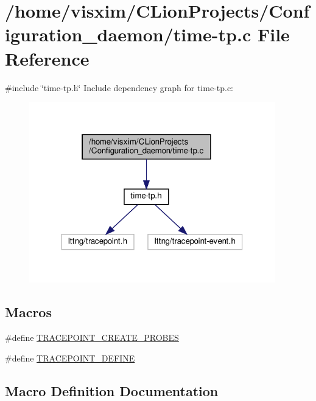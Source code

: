 \hypertarget{time-tp_8c}{}\section{/home/visxim/\+C\+Lion\+Projects/\+Configuration\+\_\+daemon/time-\/tp.c File Reference}
\label{time-tp_8c}
{\ttfamily \#include \char`\"{}time-\/tp.\+h\char`\"{}}\newline
Include dependency graph for time-\/tp.c\+:
\nopagebreak
\begin{figure}[H]
\begin{center}
\leavevmode
\includegraphics[width=303pt]{time-tp_8c__incl}
\end{center}
\end{figure}
\subsection*{Macros}
\begin{DoxyCompactItemize}
\item 
\#define \hyperlink{time-tp_8c_aeb980b4a64d9b54d660780a30415b0bc}{T\+R\+A\+C\+E\+P\+O\+I\+N\+T\+\_\+\+C\+R\+E\+A\+T\+E\+\_\+\+P\+R\+O\+B\+ES}
\item 
\#define \hyperlink{time-tp_8c_a71ad37c54f22eb10bdfed4267d53bd79}{T\+R\+A\+C\+E\+P\+O\+I\+N\+T\+\_\+\+D\+E\+F\+I\+NE}
\end{DoxyCompactItemize}


\subsection{Macro Definition Documentation}
\mbox{\label{time-tp_8c_aeb980b4a64d9b54d660780a30415b0bc}} 
